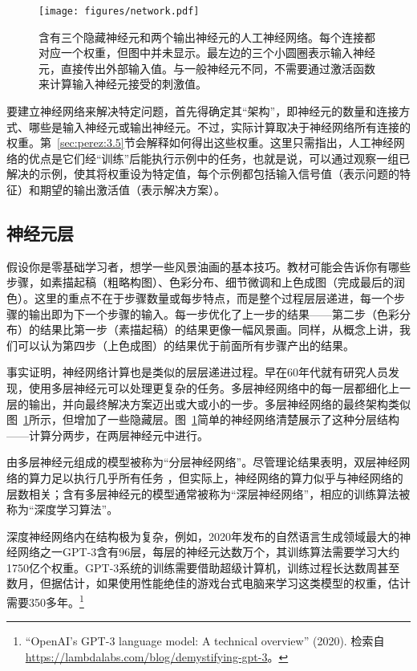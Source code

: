 \documentclass[output=paper,colorlinks,citecolor=brown]{langscibook}
\begin{document}
\begin{figure}[tb]
    \centering
    \texttt{[image: figures/network.pdf]}
    \caption{含有三个隐藏神经元和两个输出神经元的人工神经网络。每个连接都对应一个权重，但图中并未显示。最左边的三个小圆圈表示输入神经元，直接传出外部输入值。与一般神经元不同，不需要通过激活函数来计算输入神经元接受的刺激值。}
    \label{fg:nn}
\end{figure}
 
要建立神经网络来解决特定问题，首先得确定其“架构”，即神经元的数量和连接方式、哪些是输入神经元或输出神经元。不过，实际计算取决于神经网络所有连接的权重。第~\ref{sec:perez:3.5}节会解释如何得出这些权重。这里只需指出，人工神经网络的优点是它们经“训练”后能执行示例中的任务，也就是说，可以通过观察一组已解决的示例，使其将权重设为特定值，每个示例都包括输入信号值（表示问题的特征）和期望的输出激活值（表示解决方案）。


\subsection{神经元层}
\label{sec:layers}
假设你是零基础学习者，想学一些风景油画的基本技巧。教材可能会告诉你有哪些步骤，如素描起稿（粗略构图）、色彩分布、细节微调和上色成图（完成最后的润色）。这里的重点不在于步骤数量或每步特点，而是整个过程层层递进，每一个步骤的输出即为下一个步骤的输入。每一步优化了上一步的结果——第二步（色彩分布）的结果比第一步（素描起稿）的结果更像一幅风景画。同样，从概念上讲，我们可以认为第四步（上色成图）的结果优于前面所有步骤产出的结果。

事实证明，神经网络计算也是类似的层层递进过程。早在60年代就有研究人员发现，使用多层神经元可以处理更复杂的任务。多层神经网络中的每一层都细化上一层的输出，并向最终解决方案迈出或大或小的一步。多层神经网络的最终架构类似图~\ref{fg:nn}所示，但增加了一些隐藏层。图~\ref{fg:nn}简单的神经网络清楚展示了这种分层结构——计算分两步，在两层神经元中进行。

由多层神经元组成的模型被称为“分层神经网络”。尽管理论结果表明，双层神经网络的算力足以执行几乎所有任务 \citep{hornik91}，但实际上，神经网络的算力似乎与神经网络的层数相关；含有多层神经元的模型通常被称为“深层神经网络”，相应的训练算法被称为“深度学习算法”。

深度神经网络内在结构极为复杂，例如，2020年发布的自然语言生成领域最大的神经网络之一GPT-3\citep{Brown2020}含有$96$层，每层的神经元达数万个，其训练算法需要学习大约1750亿个权重。GPT-3系统的训练需要借助超级计算机，训练过程长达数周甚至数月，但据估计，如果使用性能绝佳的游戏台式电脑来学习这类模型的权重，估计需要350多年。\footnote{``OpenAI's GPT-3 language model: A technical overview'' (2020). 检索自 \url{https://lambdalabs.com/blog/demystifying-gpt-3}。}
\end{document}
